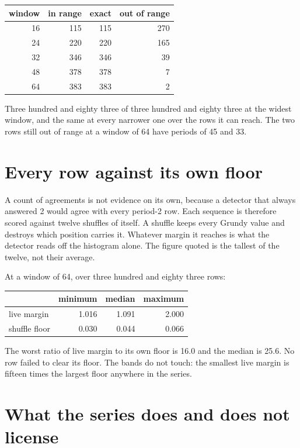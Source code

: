 \begin{center}
\begin{tabular}{@{}rrrr@{}}
\toprule
window & in range & exact & out of range \\
\midrule
16 & 115 & 115 & 270 \\
24 & 220 & 220 & 165 \\
32 & 346 & 346 & 39 \\
48 & 378 & 378 & 7 \\
64 & 383 & 383 & 2 \\
\bottomrule
\end{tabular}
\end{center}

Three hundred and eighty three of three hundred and eighty three at the widest window, and the same
at every narrower one over the rows it can reach. The two rows still out of range at a window of 64
have periods of 45 and 33.

\section{Every row against its own floor}

A count of agreements is not evidence on its own, because a detector that always answered 2 would
agree with every period-2 row. Each sequence is therefore scored against twelve shuffles of itself.
A shuffle keeps every Grundy value and destroys which position carries it. Whatever margin it
reaches is what the detector reads off the histogram alone. The figure quoted is the tallest of the
twelve, not their average.

At a window of 64, over three hundred and eighty three rows:

\begin{center}
\begin{tabular}{@{}lrrr@{}}
\toprule
 & minimum & median & maximum \\
\midrule
live margin & 1.016 & 1.091 & 2.000 \\
shuffle floor & 0.030 & 0.044 & 0.066 \\
\bottomrule
\end{tabular}
\end{center}

The worst ratio of live margin to its own floor is 16.0 and the median is 25.6. No row failed to
clear its floor. The bands do not touch: the smallest live margin is fifteen times the largest
floor anywhere in the series.

\section{What the series does and does not license}

